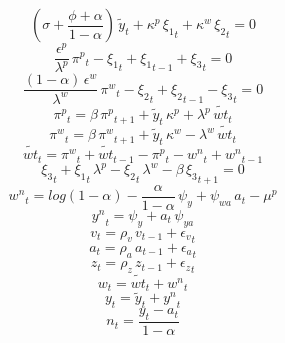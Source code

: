 \begin{dmath}
\left({{\sigma}}+\frac{{{\phi}}+{{\alpha}}}{1-{{\alpha}}}\right)\, {{\tilde{y}}_{t}}+{{\kappa^p}}\, {{\xi_1}_{t}}+{{\kappa^w}}\, {{\xi_2}_{t}}=0
\end{dmath}
\begin{dmath}
\frac{{{\epsilon^p}}}{{{\lambda^p}}}\, {{\pi^p}_{t}}-{{\xi_1}_{t}}+{{\xi_1}_{t-1}}+{{\xi_3}_{t}}=0
\end{dmath}
\begin{dmath}
\frac{\left(1-{{\alpha}}\right)\, {{\epsilon^w}}}{{{\lambda^w}}}\, {{\pi^w}_{t}}-{{\xi_2}_{t}}+{{\xi_2}_{t-1}}-{{\xi_3}_{t}}=0
\end{dmath}
\begin{dmath}
{{\pi^p}_{t}}={{\beta}}\, {{\pi^p}_{t+1}}+{{\tilde{y}}_{t}}\, {{\kappa^p}}+{{\lambda^p}}\, {{\tilde{wt}}_{t}}
\end{dmath}
\begin{dmath}
{{\pi^w}_{t}}={{\beta}}\, {{\pi^w}_{t+1}}+{{\tilde{y}}_{t}}\, {{\kappa^w}}-{{\lambda^w}}\, {{\tilde{wt}}_{t}}
\end{dmath}
\begin{dmath}
{{\tilde{wt}}_{t}}={{\pi^w}_{t}}+{{\tilde{wt}}_{t-1}}-{{\pi^p}_{t}}-{{w^n}_{t}}+{{w^n}_{t-1}}
\end{dmath}
\begin{dmath}
{{\xi_3}_{t}}+{{\xi_1}_{t}}\, {{\lambda^p}}-{{\xi_2}_{t}}\, {{\lambda^w}}-{{\beta}}\, {{\xi_3}_{t+1}}=0
\end{dmath}
\begin{dmath}
{{w^n}_{t}}=log\left(1-{{\alpha}}\right)-\frac{{{\alpha}}}{1-{{\alpha}}}\, {{\psi_{y}}}+{{\psi_{wa}}}\, {{a}_{t}}-{{\mu^p}}
\end{dmath}
\begin{dmath}
{{y^n}_{t}}={{\psi_{y}}}+{{a}_{t}}\, {{\psi_{ya}}}
\end{dmath}
\begin{dmath}
{{v}_{t}}={{\rho_v}}\, {{v}_{t-1}}+{{\epsilon_v}_{t}}
\end{dmath}
\begin{dmath}
{{a}_{t}}={{\rho_a}}\, {{a}_{t-1}}+{{\epsilon_a}_{t}}
\end{dmath}
\begin{dmath}
{{z}_{t}}={{\rho_z}}\, {{z}_{t-1}}+{{\epsilon_z}_{t}}
\end{dmath}
\begin{dmath}
{{w}_{t}}={{\tilde{wt}}_{t}}+{{w^n}_{t}}
\end{dmath}
\begin{dmath}
{{y}_{t}}={{\tilde{y}}_{t}}+{{y^n}_{t}}
\end{dmath}
\begin{dmath}
{{n}_{t}}=\frac{{{y}_{t}}-{{a}_{t}}}{1-{{\alpha}}}
\end{dmath}
